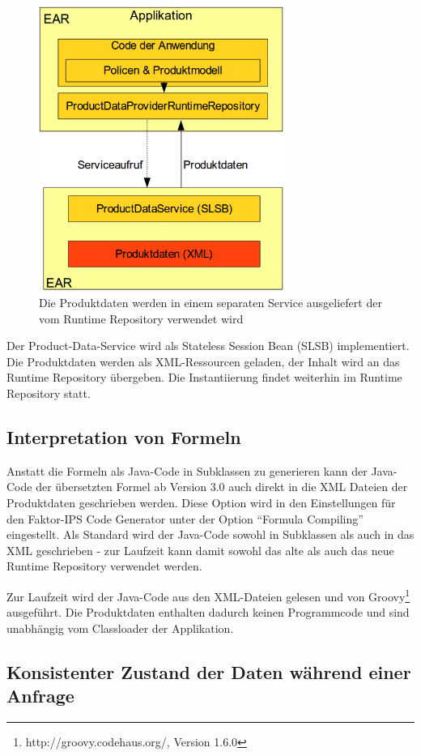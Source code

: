 \documentclass[headsepline=true, footsepline=true]{scrartcl}
\begin{document}
\begin{figure}[htb] \centering
\includegraphics[width=8cm]{./pics/service_architecture.png} \caption{Die
Produktdaten werden in einem separaten Service ausgeliefert der vom Runtime
Repository verwendet wird}
\label{service_architecture}
\end{figure}

Der Product-Data-Service wird als Stateless Session Bean (SLSB) implementiert.
Die Produktdaten werden als XML-Ressourcen geladen, der Inhalt wird an das
Runtime Repository übergeben. Die Instantiierung findet weiterhin im Runtime
Repository statt.

\subsection{Interpretation von Formeln}

Anstatt die Formeln als Java-Code in Subklassen zu generieren kann der
Java-Code der übersetzten Formel ab Version 3.0 auch direkt in die XML Dateien
der Produktdaten geschrieben werden. Diese Option wird in den Einstellungen für den Faktor-IPS Code Generator
unter der Option "`Formula Compiling"' eingestellt. Als Standard wird der
Java-Code sowohl in Subklassen als auch in das XML geschrieben - zur Laufzeit
kann damit sowohl das alte als auch das neue Runtime Repository verwendet
werden.

Zur Laufzeit wird der Java-Code aus den XML-Dateien gelesen und von
Groovy\footnote{http://groovy.codehaus.org/, Version 1.6.0} ausgeführt. Die
Produktdaten enthalten dadurch keinen Programmcode und sind unabhängig vom Classloader der
Applikation.

\subsection{Konsistenter Zustand der Daten während einer Anfrage}
\end{document}
